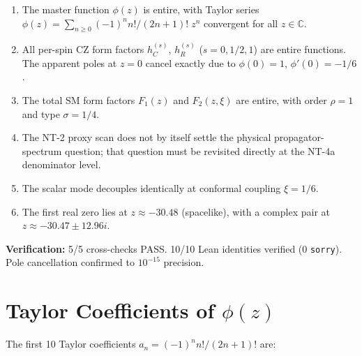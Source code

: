 \documentclass[11pt,a4paper]{article}
\theoremstyle{plain}
\theoremstyle{definition}
\begin{document}
\begin{tcolorbox}[colback=blue!5!white, colframe=blue!50!black,
  title={\textbf{NT-2 Main Results}}]
\begin{enumerate}[nosep]
  \item The master function $\phi(z)$ is entire, with Taylor series
    $\phi(z) = \sum_{n \geq 0} (-1)^n n!/(2n+1)!\; z^n$ convergent
    for all $z \in \mathbb{C}$.
  \item All per-spin CZ form factors $h_C^{(s)}$, $h_R^{(s)}$
    ($s = 0, 1/2, 1$) are entire functions. The apparent poles at
    $z = 0$ cancel exactly due to $\phi(0) = 1$, $\phi'(0) = -1/6$.
  \item The total SM form factors $F_1(z)$ and $F_2(z,\xi)$ are
    entire, with order $\rho = 1$ and type $\sigma = 1/4$.
  \item The NT-2 proxy scan does not by itself settle the physical
    propagator-spectrum question; that question must be revisited directly
    at the NT-4a denominator level.
  \item The scalar mode decouples identically at conformal coupling
    $\xi = 1/6$.
  \item The first real zero lies at $z \approx -30.48$ (spacelike),
    with a complex pair at $z \approx -30.47 \pm 12.96i$.
\end{enumerate}

\medskip
\noindent\textbf{Verification:} 5/5 cross-checks PASS.
10/10 Lean identities verified (0 \texttt{sorry}).
Pole cancellation confirmed to $10^{-15}$ precision.
\end{tcolorbox}

\appendix
\section{Taylor Coefficients of $\phi(z)$}\label{app:taylor}

The first 10 Taylor coefficients $a_n = (-1)^n n!/(2n+1)!$ are:
\end{document}
